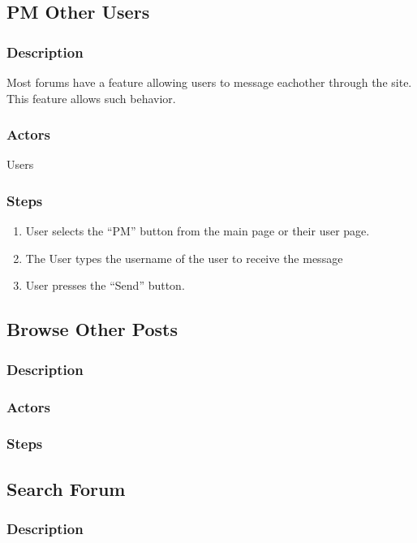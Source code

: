 \documentclass[12pt]{scrartcl}
\begin{document}
\subsection{PM Other Users}
\subsubsection{Description}

Most forums have a feature allowing users to message eachother through the site. This
feature allows such behavior.

\subsubsection{Actors}

Users

\subsubsection{Steps}
\begin{enumerate}
\item User selects the ``PM'' button from the main page or their user page.
\item The User types the username of the user to receive the message
\item User presses the ``Send'' button.
\end{enumerate}

\subsection{Browse Other Posts}
\subsubsection{Description}
\subsubsection{Actors}
\subsubsection{Steps}

\subsection{Search Forum}
\subsubsection{Description}
\end{document}

